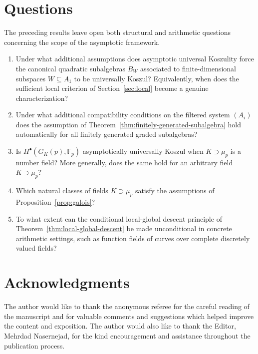 \documentclass[11pt]{amsart}
\numberwithin{equation}{section}
\theoremstyle{definition}
\begin{document}
	\section{Questions}
	
	The preceding results leave open both structural and arithmetic questions concerning the scope of the asymptotic framework.
	
	\begin{enumerate}
		
		\item  Under what additional assumptions does asymptotic universal Koszulity force the canonical quadratic subalgebras \(B_W\) associated to finite-dimensional subspaces \(W\subseteq A_1\) to be universally Koszul? Equivalently, when does the sufficient local criterion of Section~\ref{sec:local} become a genuine characterization?
		
		\item Under what additional compatibility conditions on the filtered system \((A_i)\) does the assumption of Theorem~\ref{thm:finitely-generated-subalgebra} hold automatically for all finitely generated graded subalgebras? 
		
		\item Is \(H^\bullet(G_K(p),\mathbb F_p)\) asymptotically universally Koszul when \(K\supset \mu_p\) is a number field? More generally, does the same hold for an arbitrary field \(K\supset \mu_p\)?
		
		\item Which natural classes of fields \(K\supset \mu_p\) satisfy the assumptions of Proposition~\ref{prop:galois}? 
		
		\item To what extent can the conditional local-global descent principle of Theorem~\ref{thm:local-global-descent} be made unconditional in concrete arithmetic settings, such as function fields of curves over complete discretely valued fields? 
		
		
		
	\end{enumerate}


\section*{Acknowledgments} The author would like to thank the anonymous referee for the careful reading of the manuscript and for valuable comments and suggestions which helped improve the content and exposition. The author would also like to thank the Editor, Mehrdad Nasernejad, for the kind encouragement and assistance throughout the publication process.
\end{document}

